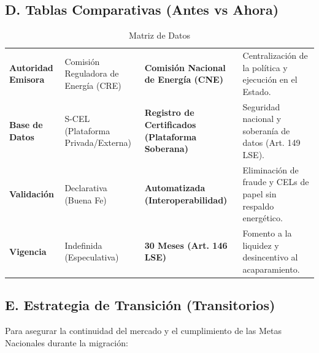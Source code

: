 \documentclass{cel}
\begin{document}
\subsection{D. Tablas Comparativas (Antes vs Ahora)}
\nopagebreak

\vspace{0.3cm}
\begin{tabladoradoLargo}
\renewcommand{\tabularxcolumn}[1]{p{#1}}
\begin{xltabular}{\textwidth}{|X|X|X|X|}
\caption{Matriz de Datos} \\
\toprule
{}  &  &  &  \\
\midrule
\endhead
\textbf{Autoridad Emisora} & Comisión Reguladora de Energía (CRE) & \textbf{Comisión Nacional de Energía (CNE)} & Centralización de la política y ejecución en el Estado. \\ \hline
\textbf{Base de Datos} & S-CEL (Plataforma Privada/Externa) & \textbf{Registro de Certificados (Plataforma Soberana)} & Seguridad nacional y soberanía de datos (Art. 149 LSE). \\ \hline
\textbf{Validación} & Declarativa (Buena Fe) & \textbf{Automatizada (Interoperabilidad)} & Eliminación de fraude y \textquotedbl{}CELs de papel\textquotedbl{} sin respaldo energético. \\ \hline
\textbf{Vigencia} & Indefinida (Especulativa) & \textbf{30 Meses (Art. 146 LSE)} & Fomento a la liquidez y desincentivo al acaparamiento. \\ \hline
\bottomrule
\end{xltabular}
\end{tabladoradoLargo}

\subsection{E. Estrategia de Transición (Transitorios)}
\nopagebreak

Para asegurar la continuidad del mercado y el cumplimiento de las Metas Nacionales durante la migración:
\end{document}
